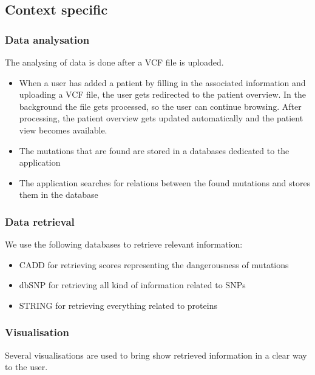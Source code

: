 \subsection{Context specific}

\subsubsection{Data analysation}

The analysing of data is done after a VCF file is uploaded.

\begin{itemize}
  \item When a user has added a patient by filling in the associated information and uploading a VCF file, the user gets redirected to the patient overview. In the background the file gets processed, so the user can continue browsing. After processing, the patient overview gets updated automatically and the patient view becomes available.
  \item The mutations that are found are stored in a databases dedicated to the application
  \item The application searches for relations between the found mutations and stores them in the database
\end{itemize}

\subsubsection{Data retrieval}

We use the following databases to retrieve relevant information:

\begin{itemize}
  \item CADD for retrieving scores representing the dangerousness of mutations
  \item dbSNP for retrieving all kind of information related to SNPs
  \item STRING for retrieving everything related to proteins
\end{itemize}

\subsubsection{Visualisation}

Several visualisations are used to bring show retrieved information in a clear way to the user.

